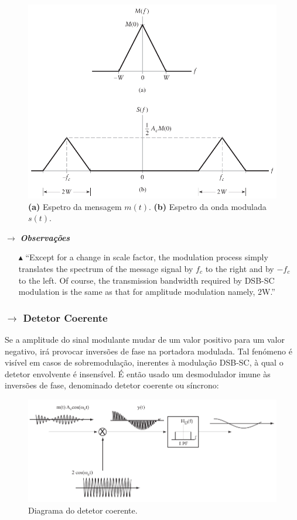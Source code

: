 \begin{figure}[H]
    \centering
    \includegraphics[width = 0.8\linewidth]{img/analog/AM/freqDomainDSB-DC.png}
    \caption{\textbf{(a)} Espetro da mensagem $m(t)$. \textbf{(b)} Espetro da onda modulada $s(t)$.}
    \label{fig:FreqDSB-DC}
\end{figure}

\noindent $\pmb{\rightarrow}$ \textbf{\textit{Observações}}
\begin{itemize}
    \item[$\blacktriangle$] ``Except for a change in scale factor, the modulation process simply translates the spectrum of the message signal by $f_c$ to the right and by $-f_c$ to the left. Of course, the transmission bandwidth required by DSB-SC modulation is the same as that for amplitude modulation namely, 2W.''\cite{Haykin2007}
\end{itemize}


\clearpage
\subsubsection[2.1.4 Detetor Coerente]{$\rightarrow$ Detetor Coerente}
\label{subsubsec:DetetorCoerente}
Se a amplitude do sinal modulante mudar de um valor positivo para um valor negativo, irá provocar inversões de fase na portadora modulada. Tal fenómeno é visível em casos de sobremodulação, inerentes à modulação DSB-SC, à qual o detetor envolvente é insensível. É então usado um desmodulador imune às inversões de fase, denominado detetor coerente ou síncrono:

\begin{figure}[H]
    \centering
    \includegraphics[width = 1\linewidth]{img/analog/AM/detetorSincrono.png}
    \caption{Diagrama do detetor coerente.}
    \label{fig:detetorCoerente}
\end{figure}

